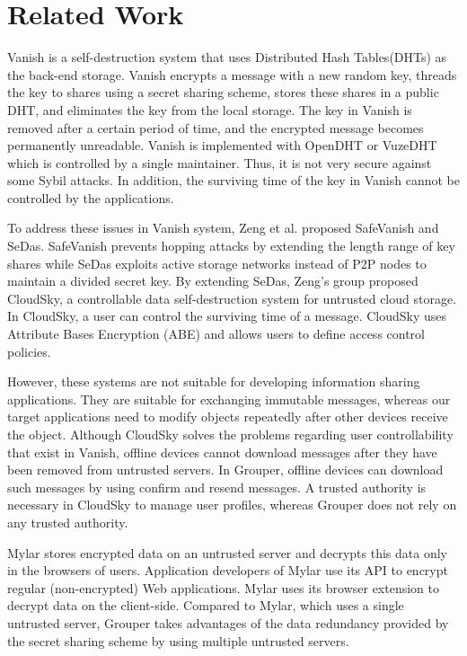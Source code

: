 \documentclass[sigconf]{acmart}
\begin{document}
\section{Related Work}

Vanish is a self-destruction system\cite{geambasu2009vanish} that uses Distributed Hash Tables(DHTs) as the back-end storage.
Vanish encrypts a message with a new random key, threads the key to shares using a secret sharing scheme, stores these shares in a public DHT, and eliminates the key from the local storage.
The key in Vanish is removed after a certain period of time, and the encrypted message becomes permanently unreadable.
Vanish is implemented with OpenDHT\cite{rhea2005opendht} or VuzeDHT\cite{vuzedht} which is controlled by a single maintainer. 
Thus, it is not very secure against some Sybil attacks\cite{wolchok2010defeating}. 
In addition, the surviving time of the key in Vanish cannot be controlled by the applications. 

To address these issues in Vanish system, Zeng et al. proposed SafeVanish\cite{zeng2010safevanish} and SeDas\cite{zeng2012sedas}. 
SafeVanish prevents hopping attacks by extending the length range of key shares while SeDas exploits active storage networks instead of P2P nodes to maintain a divided secret key. By extending SeDas, Zeng's group proposed CloudSky\cite{zeng2015cloudsky}, a controllable data self-destruction system for untrusted cloud storage. 
In CloudSky, a user can control the surviving time of a message.
CloudSky uses Attribute Bases Encryption (ABE) and allows users to define access control policies.

However, these systems are not suitable for developing information sharing applications. 
They are suitable for exchanging immutable messages, whereas our target applications need to modify objects repeatedly after other devices receive the object. 
Although CloudSky solves the problems regarding user controllability that exist in Vanish, offline devices cannot download messages after they have been removed from untrusted servers.
In Grouper, offline devices can download such messages by using confirm and resend messages.
A trusted authority is necessary in CloudSky to manage user profiles, whereas Grouper does not rely on any trusted authority.

Mylar\cite{popa2014building} stores encrypted data on an untrusted server and decrypts this data only in the browsers of users. 
Application developers of Mylar use its API to encrypt regular (non-encrypted) Web applications. 
Mylar uses its browser extension to decrypt data on the client-side. 
Compared to Mylar, which uses a single untrusted server, Grouper takes advantages of the data redundancy provided by the secret sharing scheme by using multiple untrusted servers.
\end{document}
